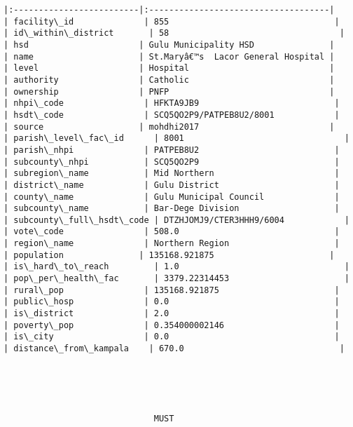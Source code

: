 \documentclass[11pt]{article}
\begin{document}
\begin{Verbatim}[commandchars=\\\{\}]
|:-------------------------|:------------------------------------|
| facility\_id              | 855                                 |
| id\_within\_district       | 58                                  |
| hsd                      | Gulu Municipality HSD               |
| name                     | St.Maryâ€™s  Lacor General Hospital |
| level                    | Hospital                            |
| authority                | Catholic                            |
| ownership                | PNFP                                |
| nhpi\_code                | HFKTA9JB9                           |
| hsdt\_code                | SCQ5QO2P9/PATPEB8U2/8001            |
| source                   | mohdhi2017                          |
| parish\_level\_fac\_id      | 8001                                |
| parish\_nhpi              | PATPEB8U2                           |
| subcounty\_nhpi           | SCQ5QO2P9                           |
| subregion\_name           | Mid Northern                        |
| district\_name            | Gulu District                       |
| county\_name              | Gulu Municipal Council              |
| subcounty\_name           | Bar-Dege Division                   |
| subcounty\_full\_hsdt\_code | DTZHJOMJ9/CTER3HHH9/6004            |
| vote\_code                | 508.0                               |
| region\_name              | Northern Region                     |
| population               | 135168.921875                       |
| is\_hard\_to\_reach         | 1.0                                 |
| pop\_per\_health\_fac       | 3379.22314453                       |
| rural\_pop                | 135168.921875                       |
| public\_hosp              | 0.0                                 |
| is\_district              | 2.0                                 |
| poverty\_pop              | 0.354000002146                      |
| is\_city                  | 0.0                                 |
| distance\_from\_kampala    | 670.0                               |





                              MUST                               


\end{Verbatim}
\end{document}

